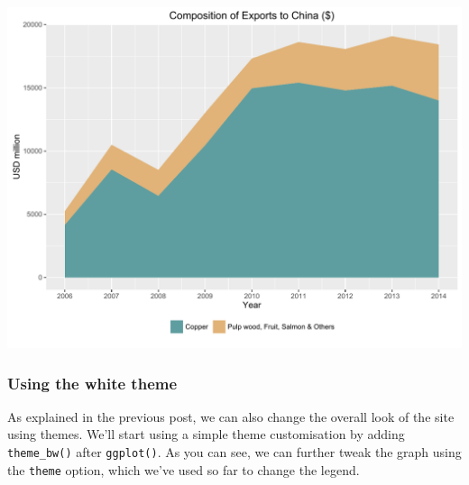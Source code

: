 \documentclass[]{article}
\newenvironment{Shaded}{\begin{snugshade}}{\end{snugshade}}
\newcommand{\KeywordTok}[1]{\textcolor[rgb]{0.13,0.29,0.53}{\textbf{{#1}}}}
\newcommand{\DataTypeTok}[1]{\textcolor[rgb]{0.13,0.29,0.53}{{#1}}}
\newcommand{\StringTok}[1]{\textcolor[rgb]{0.31,0.60,0.02}{{#1}}}
\newcommand{\NormalTok}[1]{{#1}}
\begin{document}
\begin{Shaded}
\end{Shaded}

\begin{center}\includegraphics{0_all_posts_pdf/area_6-1} \end{center}

\subsubsection{Using the white theme}\label{using-the-white-theme-1}

As explained in the previous post, we can also change the overall look
of the site using themes. We'll start using a simple theme customisation
by adding \texttt{theme\_bw()} after \texttt{ggplot()}. As you can see,
we can further tweak the graph using the \texttt{theme} option, which
we've used so far to change the legend.
\end{document}
